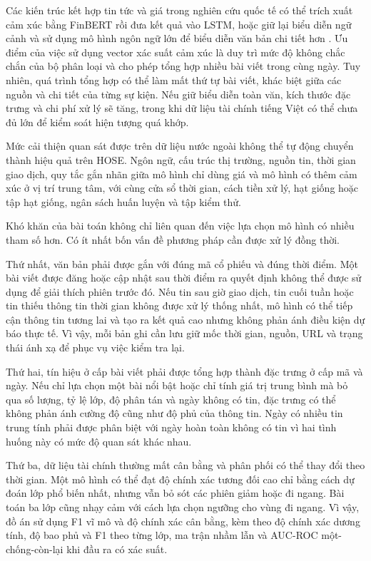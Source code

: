 \documentclass[12pt, a4paper, oneside]{report}
\begin{document}
Các kiến trúc kết hợp tin tức và giá trong nghiên cứu quốc tế có thể trích xuất cảm
xúc bằng FinBERT rồi đưa kết quả vào LSTM, hoặc giữ lại biểu diễn ngữ cảnh và sử dụng
mô hình ngôn ngữ lớn để biểu diễn văn bản chi tiết hơn
\cite{Halder2022_221107392v1,Gu2024_240716150v1,Elahi2024_241101368v1}. Ưu điểm của
việc sử dụng vector xác suất cảm xúc là duy trì mức độ không chắc chắn của bộ phân loại
và cho phép tổng hợp nhiều bài viết trong cùng ngày. Tuy nhiên, quá trình tổng hợp có
thể làm mất thứ tự bài viết, khác biệt giữa các nguồn và chi tiết của từng sự kiện.
Nếu giữ biểu diễn toàn văn, kích thước đặc trưng và chi phí xử lý sẽ tăng, trong khi
dữ liệu tài chính tiếng Việt có thể chưa đủ lớn để kiểm soát hiện tượng quá khớp.

Mức cải thiện quan sát được trên dữ liệu nước ngoài không thể tự động chuyển thành hiệu
quả trên HOSE. Ngôn ngữ, cấu trúc thị trường, nguồn tin, thời gian giao dịch, quy tắc gắn nhãn
giữa mô hình chỉ dùng giá và mô hình có thêm cảm xúc ở vị trí trung tâm, với cùng cửa sổ
thời gian, cách tiền xử lý, hạt giống hoặc tập hạt giống, ngân sách huấn luyện và tập kiểm thử.

Khó khăn của bài toán không chỉ liên quan đến việc lựa chọn mô hình có nhiều tham số
hơn. Có ít nhất bốn vấn đề phương pháp cần được xử lý đồng thời.

Thứ nhất, văn bản phải được gắn với đúng mã cổ phiếu và đúng thời điểm. Một bài viết
được đăng hoặc cập nhật sau thời điểm ra quyết định không thể được sử dụng để giải thích
phiên trước đó. Nếu tin sau giờ giao dịch, tin cuối tuần hoặc tin thiếu thông tin thời
gian không được xử lý thống nhất, mô hình có thể tiếp cận thông tin tương lai và tạo ra
kết quả cao nhưng không phản ánh điều kiện dự báo thực tế. Vì vậy, mỗi bản ghi cần lưu
giữ mốc thời gian, nguồn, URL và trạng thái ánh xạ để phục vụ việc kiểm tra lại.

Thứ hai, tín hiệu ở cấp bài viết phải được tổng hợp thành đặc trưng ở cấp mã và ngày.
Nếu chỉ lựa chọn một bài nổi bật hoặc chỉ tính giá trị trung bình mà bỏ qua số lượng,
tỷ lệ lớp, độ phân tán và ngày không có tin, đặc trưng có thể không phản ánh cường độ
cũng như độ phủ của thông tin. Ngày có nhiều tin trung tính phải được phân biệt với
ngày hoàn toàn không có tin vì hai tình huống này có mức độ quan sát khác nhau.

Thứ ba, dữ liệu tài chính thường mất cân bằng và phân phối có thể thay đổi theo thời
gian. Một mô hình có thể đạt độ chính xác tương đối cao chỉ bằng cách dự đoán lớp phổ
biến nhất, nhưng vẫn bỏ sót các phiên giảm hoặc đi ngang. Bài toán ba lớp cũng nhạy
cảm với cách lựa chọn ngưỡng cho vùng đi ngang. Vì vậy, đồ án sử dụng F1 vĩ mô và độ
chính xác cân bằng, kèm theo độ chính xác dương tính, độ bao phủ và F1 theo từng lớp,
ma trận nhầm lẫn và AUC-ROC một-chống-còn-lại khi đầu ra có xác suất.
\end{document}
